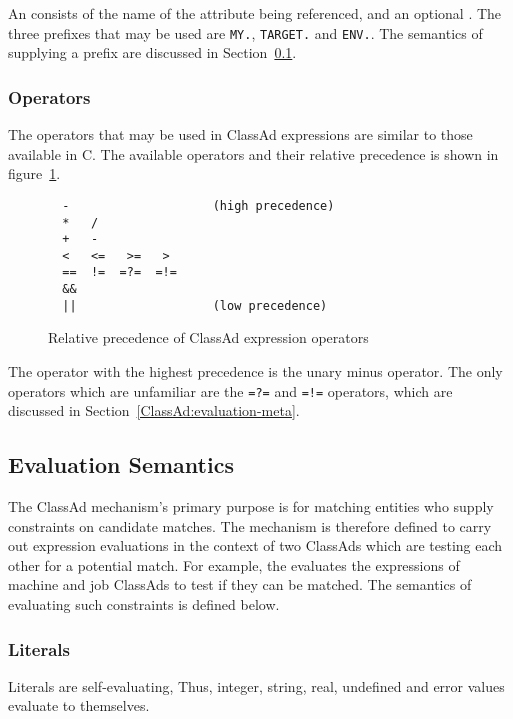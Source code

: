 An  consists of the name of the attribute being 
referenced, and an optional .  The three 
prefixes that may be used are \texttt{MY.}, \texttt{TARGET.} and \texttt{ENV.}.
The semantics of supplying a prefix are discussed in 
Section~\ref{ClassAd:evaluation}.

\subsubsection{Operators}
The operators that may be used in ClassAd expressions are similar to those
available in C.  The available operators and their relative precedence is shown 
in figure~\ref{ClassAd:operator-fig}.
\begin{figure}[h]
\begin{verbatim}
  -                    (high precedence)
  *   / 
  +   -
  <   <=   >=   >
  ==  !=  =?=  =!=
  &&
  ||                   (low precedence) 
\end{verbatim}
\caption{\label{ClassAd:operator-fig}Relative precedence of ClassAd expression
operators}
\end{figure}
The operator with the highest precedence is the unary minus operator.  The
only operators which are unfamiliar are the \verb+=?=+ and \verb+=!=+
operators, which are discussed in Section~\ref{ClassAd:evaluation-meta}.

\subsection{Evaluation Semantics}
\label{ClassAd:evaluation}
The ClassAd mechanism's primary purpose is for matching entities who supply
constraints on candidate matches.  The mechanism is therefore defined to
carry out expression evaluations in the context of two ClassAds which are
testing each other for a potential match.  For example, the 
evaluates the  expressions of machine and job ClassAds to
test if they can be matched.  The semantics of evaluating such constraints
is defined below.

\subsubsection{Literals}
Literals are self-evaluating, Thus, integer, string, real, undefined and
error values evaluate to themselves.


